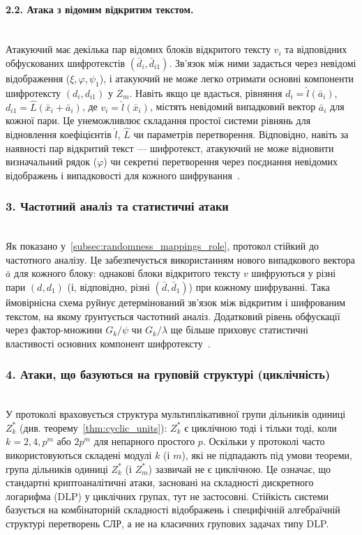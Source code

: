 \paragraph{2.2. Атака з відомим відкритим текстом.} \\
Атакуючий має декілька пар відомих блоків відкритого тексту $v_i$ та відповідних обфускованих шифротекстів $(\bar{d}_i, \bar{d}_{i1})$. Зв'язок між ними задається через невідомі відображення ($\xi, \varphi, \psi_1$), і атакуючий не може легко отримати основні компоненти шифротексту $(d_i, d_{i1})$ у $Z_m$. Навіть якщо це вдасться, рівняння $d_i = \hat{l}(\bar{a}_i)$, $d_{i1} = \hat{L}(\bar{x}_i + \bar{a}_i)$, де $v_i = \hat{l}(\bar{x}_i)$, містять невідомий випадковий вектор $\bar{a}_i$ для кожної пари. Це унеможливлює складання простої системи рівнянь для відновлення коефіцієнтів $\hat{l}$, $\hat{L}$ чи параметрів перетворення. Відповідно, навіть за наявності пар відкритий текст — шифротекст, атакуючий не може відновити визначальний рядок ($\varphi$) чи секретні перетворення через поєднання невідомих відображень і випадковості для кожного шифрування~\cite{21}.

\subsubsection{3. Частотний аналіз та статистичні атаки} \\
\label{subsubsec:frequency_analysis}
Як показано у~\ref{subsec:randomness_mappings_role}, протокол стійкий до частотного аналізу. Це забезпечується використанням нового випадкового вектора $\bar{a}$ для кожного блоку: однакові блоки відкритого тексту $v$ шифруються у різні пари $(d, d_1)$ (і, відповідно, різні $(\bar{d}, \bar{d}_1)$) при кожному шифруванні. Така ймовірнісна схема руйнує детермінований зв'язок між відкритим і шифрованим текстом, на якому ґрунтується частотний аналіз. Додатковий рівень обфускації через фактор-множини $G_k/\psi$ чи $G_k/\lambda$ ще більше приховує статистичні властивості основних компонент шифротексту~\cite{22}.

\subsubsection{4. Атаки, що базуються на груповій структурі (циклічність)} \\
\label{subsubsec:group_structure}
У протоколі враховується структура мультиплікативної групи дільників одиниці $Z_k^*$ (див. теорему~\ref{thm:cyclic_units}): $Z_k^*$ є циклічною тоді і тільки тоді, коли $k=2,4,p^m$ або $2p^m$ для непарного простого $p$. Оскільки у протоколі часто використовуються складені модулі $k$ (і $m$), які не підпадають під умови теореми, група дільників одиниці $Z_k^*$ (і $Z_m^*$) зазвичай не є циклічною. Це означає, що стандартні криптоаналітичні атаки, засновані на складності дискретного логарифма (DLP) у циклічних групах, тут не застосовні. Стійкість системи базується на комбінаторній складності відображень і специфічній алгебраїчній структурі перетворень СЛР, а не на класичних групових задачах типу DLP.


